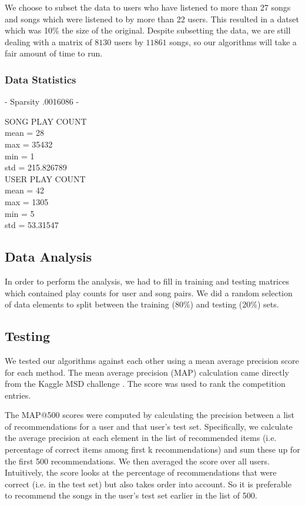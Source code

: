 \documentclass[12pt,preprint]{aastex}
\begin{document}
We choose to subset the data to users who have listened to more than 27 songs and songs which were listened to by more than 22 users. This resulted in a datset which was 10\% the size of the original. Despite subsetting the data, we are still dealing with a matrix of $8130$ users by $11861$ songs, so our algorithms will take a fair amount of time to run.

\subsubsection{Data Statistics}

- Sparsity .0016086
- 

SONG PLAY COUNT  \\
mean = 28 \\
max = 35432 \\
min = 1 \\
std = 215.826789\\

USER PLAY COUNT\\
mean = 42\\
max = 1305\\
min = 5\\
std = 53.31547\\


\subsection{Data Analysis}
In order to perform the analysis, we had to fill in training and testing matrices which contained play counts for user and song pairs. We did a random selection of data elements to split between the training (80\%) and testing (20\%) sets. 

\subsection{Testing}
We tested our algorithms against each other using a mean average precision 
score for each method.  The mean average precision (MAP) calculation came directly from the Kaggle MSD challenge \citep{kaggleMSD}. The score was used to rank the competition entries.

The MAP@500 scores were computed by calculating the precision between a list of recommendations for a user and that user's test set. Specifically, we calculate the average precision at each element in the list of recommended items (i.e. percentage of correct items among first k recommendations) and sum these up for the first 500 recommendations.
We then averaged the score over all users. Intuitively, the score looks at the percentage of recommendations that were correct (i.e. in the test set) but also takes order into account. So it is preferable to recommend the songs in the user's test set earlier in the list of 500.
\end{document}
